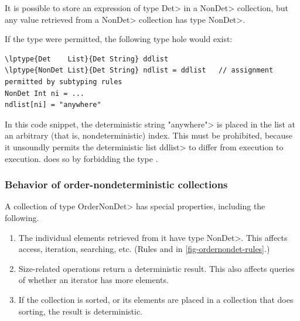 It is possible to store an expression of type \<Det> in a \<NonDet>
collection, but any value retrieved from a \<NonDet> collection has
type \<NonDet>.

If the type  were
permitted, the following type hole would exist:

\begin{Verbatim}[commandchars=\\\{\}]
\lptype{Det    List}{Det String} ddlist
\lptype{NonDet List}{Det String} ndlist = ddlist   // assignment permitted by subtyping rules
NonDet Int ni = ...
ndlist[ni] = "anywhere"
\end{Verbatim}

\noindent
In this code snippet,
the deterministic string \<"anywhere"> is placed in the list at an
arbitrary (that is, nondeterministic) index.  This must be prohibited,
because it unsoundly permits the deterministic list \<ddlist> to differ
from execution to execution.  \OurTypeSystem does so by forbidding the type
.


\subsubsection{Behavior of order-nondeterministic collections}\label{sec:ond-behavior}

A collection of type \<OrderNonDet> has special properties, including the following.

\begin{enumerate}
\item
The individual elements retrieved from it have type \<NonDet>.  This
affects access, iteration, searching, etc.
(Rules  and  in \cref{fig-ordernondet-rules}.)
\item
Size-related operations return a deterministic result.  This also affects
queries of whether an iterator has more elements.
\item
If the collection is sorted, or its elements are placed in a collection
that does sorting, the result is deterministic.
\end{enumerate}

